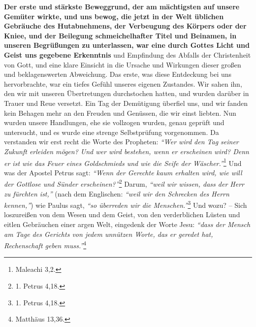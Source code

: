 \label{ref:09_05_offenbarung} \textbf{Der erste und stärkste Beweggrund, der am
mächtigsten auf unsere
Gemüter
wirkte, und uns bewog, die jetzt in der Welt üblichen Gebräuche des
Hutabnehmens, der Verbeugung des Körpers oder der Kniee, und
der Beilegung
schmeichelhafter Titel und Beinamen, in unseren Begrüßungen zu unterlassen, war
eine durch Gottes Licht und Geist uns gegebene
Erkenntnis}
und Empfindung des
Abfalls der Christenheit von Gott, und eine klare Einsicht in die Ursache und
Wirkungen dieser großen und beklagenswerten Abweichung. Das erste, was diese
Entdeckung bei uns hervorbrachte, war ein tiefes Gefühl unseres eigenen
Zustandes.
Wir sahen ihn, den wir mit unseren Übertretungen durchstochen hatten, und wurden
darüber in Trauer und Reue versetzt. Ein Tag der Demütigung
überfiel uns, und
wir fanden kein Behagen mehr an den Freuden und Genüssen, die wir einst liebten.
Nun wurden unsere Handlungen, ehe sie vollzogen wurden, genau geprüft und
untersucht, und es wurde eine strenge Selbstprüfung
vorgenommen. Da verstanden
wir erst recht die Worte des Propheten:
\textit{"`Wer wird den Tag seiner Zukunft
erleiden mögen? Und wer wird bestehen, wenn er erscheinen wird? Denn er ist wie
das Feuer eines Goldschmieds und wie die Seife der Wäscher."'}\footnote{Maleachi
3,2.}
Und was der Apostel Petrus sagt:
\textit{"`Wenn der Gerechte kaum erhalten wird, wie will der Gottlose und Sünder
erscheinen?"'}\footnote{1. Petrus 4,18.}
Darum,
\textit{"`weil wir wissen, dass der Herr zu fürchten ist,"'}
(nach dem Englischen:
\textit{"`weil wir den Schrecken des Herrn kennen,"'}) wie Paulus sagt,
\textit{"`so überreden wir die Menschen."'}\footnote{1. Petrus 4,18.}
Und wozu? -- Sich loszureißen von dem Wesen
und dem Geist, von den verderblichen Lüsten und eitlen Gebräuchen einer argen
Welt,
eingedenk der Worte Jesu:
\textit{"`dass der Mensch am Tage des Gerichts von jedem
unnützen Worte, das er geredet hat, Rechenschaft geben
muss."'}\footnote{Matthäus 13,36.}

\medskip

